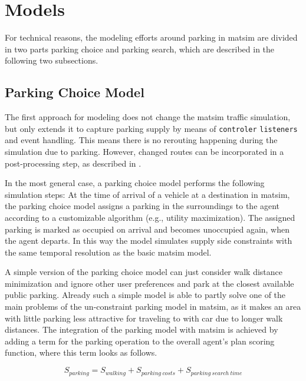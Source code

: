 \section{Models}
For technical reasons, the modeling efforts around parking in \gls{matsim} are divided in two parts parking choice and parking search, which are described in the following two subsections. 

\subsection{Parking Choice Model}
The first approach for modeling does not change the \gls{matsim} traffic simulation, but only extends it to capture parking supply by means of \lstinline|controler| \lstinline|listeners| and event handling. This means there is no rerouting happening during the simulation due to parking. However, changed routes can be incorporated in a post-processing step, as described in \citet[][]{WaraichAxhausen_TRR_2012}. 

In the most general case, a parking choice model performs the following simulation steps: At the time of arrival of a vehicle at a destination in \gls{matsim}, the parking choice model assigns a parking in the surroundings to the agent according to a customizable algorithm (e.g., utility maximization). The assigned parking is marked as occupied on arrival and becomes unoccupied again, when the agent departs. In this way the model simulates supply side constraints with the same temporal resolution as the basic \gls{matsim} model.

A simple version of the parking choice model can just consider walk distance minimization and ignore other user preferences and park at the closest available public parking. Already such a simple model is able to partly solve one of the main problems of the un-constraint parking model in \gls{matsim}, as it makes an area with little parking less attractive for traveling to with car due to longer walk distances. The integration of the parking model with \gls{matsim} is achieved by adding a term for the parking operation to the overall agent’s plan scoring function, where this term looks as follows.

\begin{equation}
\label{eq:parkingutf}
S_{parking} = S_{walking} + S_{parking\ costs} + S_{parking\ search\ time}
\end{equation}

